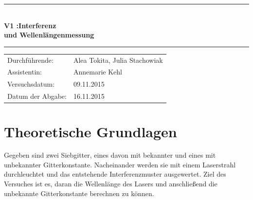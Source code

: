 \documentclass[12pt,a4paper,titlepage,headinclude,bibtotoc]{scrartcl}
\begin{document}
\begin{titlepage}
\centering

\vspace*{3cm}

\rule{\textwidth}{1pt}\\[0.5cm]
{\huge \bfseries
  V1 :Interferenz\\[1.5ex]
  und Wellenlängenmessung}\\[0.5cm]
\rule{\textwidth}{1pt}

\vspace*{3cm}


\begin{Large}
\begin{tabular}{ll}
Durchführende: &  Alea Tokita, Julia Stachowiak\\
Assistentin: & Annemarie Kehl\\
 Versuchsdatum: & 09.11.2015\\
 Datum der Abgabe: & 16.11.2015\\
\end{tabular}
\end{Large}

\vspace*{2.5cm}

\begin{Large}
\end{Large}

\end{titlepage}

\tableofcontents

\newpage




\section{Theoretische Grundlagen}
Gegeben sind zwei Siebgitter, eines davon mit bekannter und eines mit unbekannter Gitterkonstante. Nacheinander werden sie mit einem Laserstrahl durchleuchtet und das entstehende Interferenzmuster ausgewertet. Ziel des Versuches ist es, daran die Wellenlänge des Lasers und anschließend die unbekannte Gitterkonstante berechnen zu können.
\end{document}
